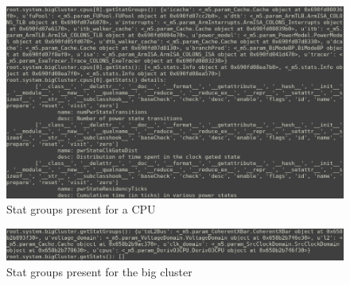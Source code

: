 \begin{figure}[H]
    \centering
    \includegraphics[width=0.9\linewidth]{screenshots/power-model-eldritchness/cpu-getStats-getStatGroups.png}
    \caption{Stat groups present for a CPU}
\end{figure}

\begin{figure}[H]
    \centering
    \includegraphics[width=0.9\linewidth]{screenshots/power-model-eldritchness/bigCluster-getStats-getStatGroups.png}
    \caption{Stat groups present for the big cluster}
\end{figure}
